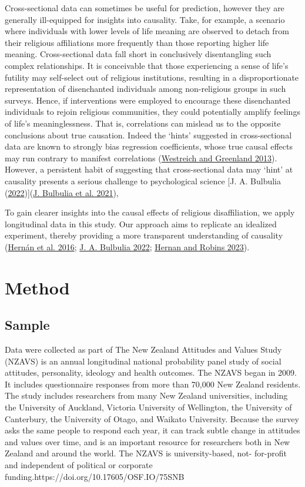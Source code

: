 \documentclass[
  singlecolumn]{report}
\begin{document}
Cross-sectional data can sometimes be useful for prediction, however
they are generally ill-equipped for insights into causality. Take, for
example, a scenario where individuals with lower levels of life meaning
are observed to detach from their religious affiliations more frequently
than those reporting higher life meaning. Cross-sectional data fall
short in conclusively disentangling such complex relationships. It is
conceivable that those experiencing a sense of life's futility may
self-select out of religious institutions, resulting in a
disproportionate representation of disenchanted individuals among
non-religious groups in such surveys. Hence, if interventions were
employed to encourage these disenchanted individuals to rejoin religious
communities, they could potentially amplify feelings of life's
meaninglessness. That is, correlations can mislead us to the opposite
conclusions about true causation. Indeed the `hints' suggested in
cross-sectional data are known to strongly bias regression coefficients,
whose true causal effects may run contrary to manifest correlations
(\protect\hyperlink{ref-westreich2013}{Westreich and Greenland 2013}).
However, a persistent habit of suggesting that cross-sectional data may
`hint' at causality presents a serious challenge to psychological
science {[}J. A. Bulbulia
(\protect\hyperlink{ref-bulbulia2022}{2022}){]}(\protect\hyperlink{ref-bulbulia2021}{J.
Bulbulia et al. 2021}),

To gain clearer insights into the causal effects of religious
disaffiliation, we apply longitudinal data in this study. Our approach
aims to replicate an idealized experiment, thereby providing a more
transparent understanding of causality
(\protect\hyperlink{ref-hernuxe1n2016}{Hernán et al. 2016};
\protect\hyperlink{ref-bulbulia2022}{J. A. Bulbulia 2022};
\protect\hyperlink{ref-hernan2023}{Hernan and Robins 2023}).

\hypertarget{method}{%
\section{Method}\label{method}}

\hypertarget{sample}{%
\subsection{Sample}\label{sample}}

Data were collected as part of The New Zealand Attitudes and Values
Study (NZAVS) is an annual longitudinal national probability panel study
of social attitudes, personality, ideology and health outcomes. The
NZAVS began in 2009. It includes questionnaire responses from more than
70,000 New Zealand residents. The study includes researchers from many
New Zealand universities, including the University of Auckland, Victoria
University of Wellington, the University of Canterbury, the University
of Otago, and Waikato University. Because the survey asks the same
people to respond each year, it can track subtle change in attitudes and
values over time, and is an important resource for researchers both in
New Zealand and around the world. The NZAVS is university-based, not-
for-profit and independent of political or corporate
funding.https://doi.org/10.17605/OSF.IO/75SNB
\end{document}
